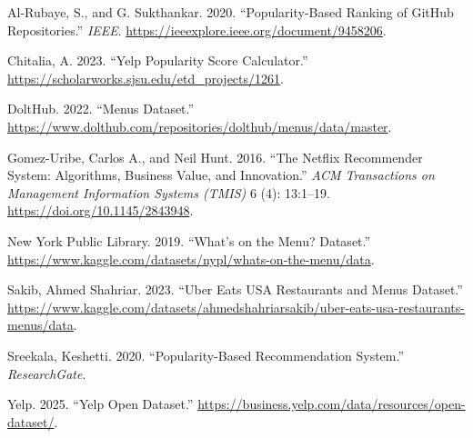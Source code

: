 \documentclass[
  11pt,
  a4paper,
  DIV=11,
  numbers=noendperiod]{scrartcl}
\newlength{\cslhangindent}
\newenvironment{CSLReferences}[2] %
 {\begin{list}{}{%
  \setlength{\itemindent}{0pt}
  \setlength{\leftmargin}{0pt}
  \setlength{\parsep}{0pt}
  \ifodd #1
   \setlength{\leftmargin}{\cslhangindent}
   \setlength{\itemindent}{-1\cslhangindent}
  \fi
  \setlength{\itemsep}{#2\baselineskip}}}
 {\end{list}}
\begin{document}
\label{refs}
\begin{CSLReferences}{1}{0}
Al-Rubaye, S., and G. Sukthankar. 2020. {``Popularity-Based Ranking of
GitHub Repositories.''} \emph{IEEE}.
\url{https://ieeexplore.ieee.org/document/9458206}.

Chitalia, A. 2023. {``Yelp Popularity Score Calculator.''}
\url{https://scholarworks.sjsu.edu/etd_projects/1261}.

DoltHub. 2022. {``Menus Dataset.''}
\url{https://www.dolthub.com/repositories/dolthub/menus/data/master}.

Gomez-Uribe, Carlos A., and Neil Hunt. 2016. {``The Netflix Recommender
System: Algorithms, Business Value, and Innovation.''} \emph{ACM
Transactions on Management Information Systems (TMIS)} 6 (4): 13:1--19.
\url{https://doi.org/10.1145/2843948}.

New York Public Library. 2019. {``What's on the Menu? Dataset.''}
\url{https://www.kaggle.com/datasets/nypl/whats-on-the-menu/data}.

Sakib, Ahmed Shahriar. 2023. {``Uber Eats USA Restaurants and Menus
Dataset.''}
\url{https://www.kaggle.com/datasets/ahmedshahriarsakib/uber-eats-usa-restaurants-menus/data}.

Sreekala, Keshetti. 2020. {``Popularity-Based Recommendation System.''}
\emph{ResearchGate}.

Yelp. 2025. {``Yelp Open Dataset.''}
\url{https://business.yelp.com/data/resources/open-dataset/}.

\end{CSLReferences}
\end{document}
